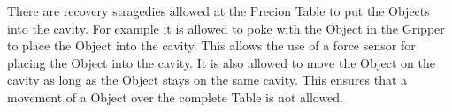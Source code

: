 There are recovery stragedies allowed at the Precion Table to put the Objects into the cavity.
For example it is allowed to poke with the Object in the Gripper to place the Object into the cavity. This  allows the use of a force sensor for placing the Object into the cavity.
It is also allowed to move the Object on the cavity as long as the Object stays on the same cavity. This ensures that a movement of a Object over the complete Table is not allowed.

 



%















%
